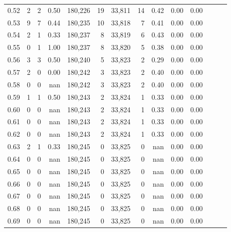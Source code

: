 \begin{tabular}{rrrrrrrrrrrrrr}
0.52 &       2 &      2 &  0.50 &  180,226 &       19 &  33,811 &      14 &  0.42 &  0.00 &      0.00 \\
0.53 &       9 &      7 &  0.44 &  180,235 &       10 &  33,818 &       7 &  0.41 &  0.00 &      0.00 \\
0.54 &       2 &      1 &  0.33 &  180,237 &        8 &  33,819 &       6 &  0.43 &  0.00 &      0.00 \\
0.55 &       0 &      1 &  1.00 &  180,237 &        8 &  33,820 &       5 &  0.38 &  0.00 &      0.00 \\
0.56 &       3 &      3 &  0.50 &  180,240 &        5 &  33,823 &       2 &  0.29 &  0.00 &      0.00 \\
0.57 &       2 &      0 &  0.00 &  180,242 &        3 &  33,823 &       2 &  0.40 &  0.00 &      0.00 \\
0.58 &       0 &      0 &   nan &  180,242 &        3 &  33,823 &       2 &  0.40 &  0.00 &      0.00 \\
0.59 &       1 &      1 &  0.50 &  180,243 &        2 &  33,824 &       1 &  0.33 &  0.00 &      0.00 \\
0.60 &       0 &      0 &   nan &  180,243 &        2 &  33,824 &       1 &  0.33 &  0.00 &      0.00 \\
0.61 &       0 &      0 &   nan &  180,243 &        2 &  33,824 &       1 &  0.33 &  0.00 &      0.00 \\
0.62 &       0 &      0 &   nan &  180,243 &        2 &  33,824 &       1 &  0.33 &  0.00 &      0.00 \\
0.63 &       2 &      1 &  0.33 &  180,245 &        0 &  33,825 &       0 &   nan &  0.00 &      0.00 \\
0.64 &       0 &      0 &   nan &  180,245 &        0 &  33,825 &       0 &   nan &  0.00 &      0.00 \\
0.65 &       0 &      0 &   nan &  180,245 &        0 &  33,825 &       0 &   nan &  0.00 &      0.00 \\
0.66 &       0 &      0 &   nan &  180,245 &        0 &  33,825 &       0 &   nan &  0.00 &      0.00 \\
0.67 &       0 &      0 &   nan &  180,245 &        0 &  33,825 &       0 &   nan &  0.00 &      0.00 \\
0.68 &       0 &      0 &   nan &  180,245 &        0 &  33,825 &       0 &   nan &  0.00 &      0.00 \\
0.69 &       0 &      0 &   nan &  180,245 &        0 &  33,825 &       0 &   nan &  0.00 &      0.00 \\

\end{tabular}
